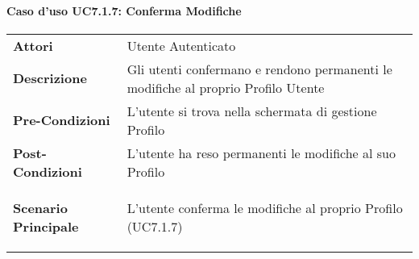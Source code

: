 \paragraph{Caso d'uso UC7.1.7:  Conferma Modifiche}
\label{UC7_1_7}

\begin{tabular}{ l | p{11cm}}
	\hline
	\rowcolor{Gray}
	 \multicolumn{2}{c}{UC7.1.7 - Conferma Modifiche} \\
	 \hline
	\textbf{Attori} & Utente Autenticato \\
	\textbf{Descrizione} & Gli utenti confermano e rendono permanenti le modifiche al proprio Profilo Utente\\
	\textbf{Pre-Condizioni} & L'utente si trova nella schermata di gestione Profilo\\
	\textbf{Post-Condizioni} & L'utente ha reso permanenti le modifiche al suo Profilo\\
	\textbf{Scenario Principale} & 
	\begin{enumerate*}[label=(\arabic*.),itemjoin={\newline}]
		\item L'utente conferma le modifiche al proprio Profilo (UC7.1.7)
	\end{enumerate*}\\
\end{tabular}